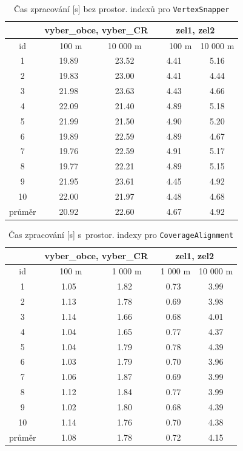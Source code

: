 \begin{table}
\centering
 \begin{tabular}{|c|c|c|c|c|}
  \hline
     & \multicolumn{2}{c|}{vyber\_obce, vyber\_CR} & 
	\multicolumn{2}{c|}{zel1, zel2} \\
  \hline
   id  &  ~~100 m~ & 10 000 m & ~~~100 m & 10 000 m\\
  \hline
  \hline
  1  & 19.89 & 23.52 & 4.41 & 5.16 \\ 
2  & 19.83 & 23.00 & 4.41 & 4.44 \\
3  & 21.98 & 23.63 & 4.43 & 4.66 \\
4  & 22.09 & 21.40 & 4.89 & 5.18 \\
5  & 21.99 & 21.50 & 4.90 & 5.20 \\
6  & 19.89 & 22.59 & 4.89 & 4.67 \\
7  & 19.76 & 22.59 & 4.91 & 5.17 \\
8  & 19.77 & 22.21 & 4.89 & 5.15 \\
9  & 21.95 & 23.61 & 4.45 & 4.92 \\
10 & 22.00 & 21.97 & 4.48 & 4.68 \\
  \hline
  \hline
  průměr & 20.92& 22.60 &4.67 & 4.92 \\
  \hline
 \end{tabular}
  \caption{ Čas zpracování [s] bez prostor. indexů pro 
	    \texttt{Vertex\-Snapper}}
  \label{tab:vs-bez}
\end{table}

\begin{table}
\centering
 \begin{tabular}{|c|c|c|c|c|}
  \hline
     & \multicolumn{2}{c|}{vyber\_obce, vyber\_CR} & 
	\multicolumn{2}{c|}{zel1, zel2} \\
  \hline
   id  &  ~~100 m~ & ~1 000 m & ~1 000 m & 10 000 m\\
  \hline
  \hline
1  &1.05 & 1.82 &  0.73 & 3.99 \\
2  &1.13 & 1.78 &  0.69 & 3.98 \\
3  &1.14 & 1.66 &  0.68 & 4.01 \\
4  &1.04 & 1.65 &  0.77 & 4.37 \\
5  &1.04 & 1.79 &  0.78 & 4.39 \\
6  &1.03 & 1.79 &  0.70 & 3.96 \\
7  &1.06 & 1.87 &  0.69 & 3.99 \\
8  &1.12 & 1.84 &  0.77 & 3.99 \\
9  &1.02 & 1.80 &  0.68 & 4.39 \\
10 &1.14 & 1.76 &  0.70 & 4.38 \\
  \hline
  \hline
  průměr & 1.08 &1.78 & 0.72 & 4.15 \\
  \hline
 \end{tabular}
  \caption{ Čas zpracování [s] s~prostor. indexy pro 
	    \texttt{Coverage\-Alignment}}
  \label{tab:ca-s}
\end{table} 

